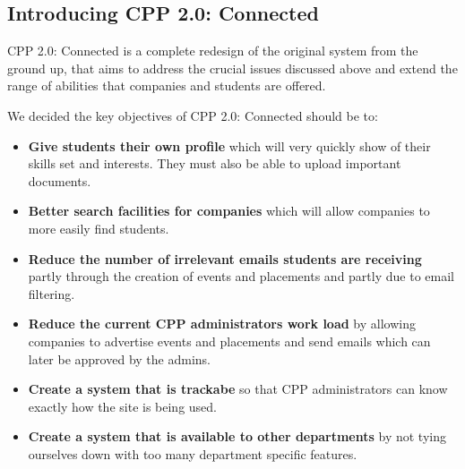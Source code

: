 \subsection{Introducing CPP 2.0: Connected}
CPP 2.0: Connected is a complete redesign of the original system from the ground up, that aims to address the crucial issues discussed above and extend the range of abilities that companies and students are offered.

We decided the key objectives of CPP 2.0: Connected should be to:
\begin{itemize}
  \item \textbf{Give students their own profile} which will very quickly show of their skills set and interests. They must also be able to upload important documents.
  \item \textbf{Better search facilities for companies} which will allow companies to more easily find students.
  \item \textbf{Reduce the number of irrelevant emails students are receiving} partly through the creation of events and placements and partly due to email filtering.
  \item \textbf{Reduce the current CPP administrators work load} by allowing companies to advertise events and placements and send emails which can later be approved by the admins.
  \item \textbf{Create a system that is trackabe} so that CPP administrators can know exactly how the site is being used.
  \item \textbf{Create a system that is available to other departments} by not tying ourselves down with too many department specific features.
\end{itemize}